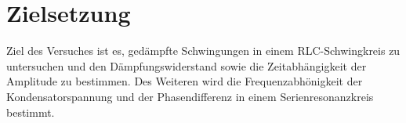 \section{Zielsetzung}
\label{sec:Zielsetzung}
Ziel des Versuches ist es, gedämpfte Schwingungen in einem RLC-Schwingkreis zu
untersuchen und den Dämpfungswiderstand sowie die Zeitabhängigkeit der Amplitude
zu bestimmen. Des Weiteren wird die Frequenzabhönigkeit der Kondensatorspannung
und der Phasendifferenz in einem Serienresonanzkreis bestimmt.
